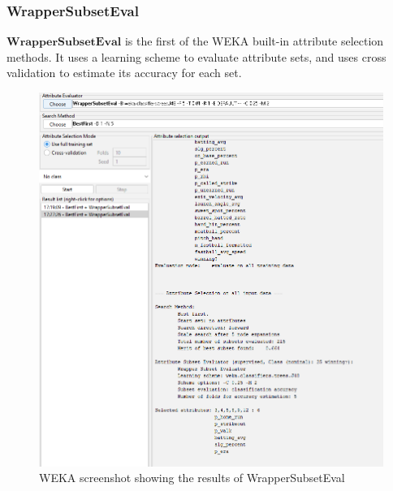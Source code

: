 \documentclass[12pt]{article}
\begin{document}
\newpage
\subsubsection{WrapperSubsetEval}
$\textbf{WrapperSubsetEval}$ is the first of the WEKA built-in attribute selection methods. It uses a learning scheme to evaluate attribute sets, and uses cross validation to estimate its accuracy for each set. 
\begin{figure}[h!]
    \includegraphics[scale=0.5]{./images/WrapperSubsetEval/WrapperSubsetEval.png}
    \centering
    \caption{WEKA screenshot showing the results of WrapperSubsetEval}
    \label{fig:Wrapper}
\end{figure}

\newpage
\end{document}
